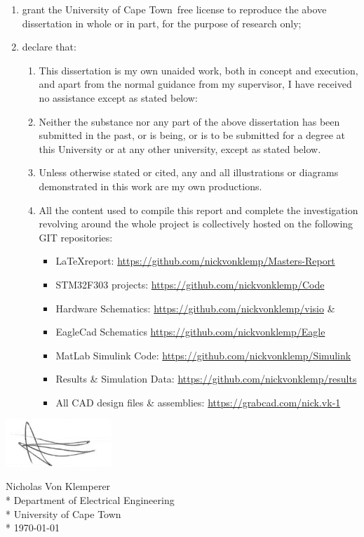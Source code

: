 \documentclass[a4paper, 11pt, oneside, openright, parskip=full]{book}
\newcommand{\auth}{Nicholas Von Klemperer}								%
\newcommand{\dept}{Department of Electrical Engineering}%
\newcommand{\uni}{University of Cape Town}				%
\newcommand*{\signature}[1]
{
	\par\noindent\makebox [5cm]{\hrulefill}
	\par\noindent\makebox [5cm][1]{#1}
}
\begin{document}
\begin{enumerate}
	\item		grant the \uni\  free license to reproduce the above dissertation in whole or in part, for the purpose of research only;
	\item		declare that:
	
	\begin{enumerate}
		\item		This dissertation is my own unaided work, both in concept and execution, and apart from the normal guidance from my supervisor, I have received no assistance except as stated below:
		\item		Neither the substance nor any part of the above dissertation has been submitted in the past, or is being, or is to be submitted for a degree at this University or at any other university, except as stated below.
		\item		Unless otherwise stated or cited, any and all illustrations or diagrams demonstrated in this work are my own productions.
		\item 		All the content used to compile this report and complete the investigation revolving around the whole project is collectively hosted on the following GIT repositories:
		\begin{itemize}
			\item \LaTeX report: \url{https://github.com/nickvonklemp/Masters-Report}
			\item STM32F303 projects: \url{https://github.com/nickvonklemp/Code}
			\item Hardware Schematics: \url{https://github.com/nickvonklemp/visio} \&
			\item EagleCad Schematics \url{https://github.com/nickvonklemp/Eagle}
			\item MatLab Simulink Code: \url{https://github.com/nickvonklemp/Simulink}
			\item Results \& Simulation Data: \url{https://github.com/nickvonklemp/results}
			\item All CAD design files \& assemblies: \url{https://grabcad.com/nick.vk-1}
		\end{itemize}
	\end{enumerate}	
\end{enumerate}

\begin{flushright}	%
	\vskip 2cm
	\noindent \includegraphics[width=0.3\textwidth]{figs/sign}
	\vspace{-20pt}
	\noindent \signature{x}
	\noindent \auth \\*
	\vskip 2mm
	\noindent \dept \\*
	\noindent \uni \\*
	\vskip 2mm
	\noindent \today
\end{flushright}
\end{document}
